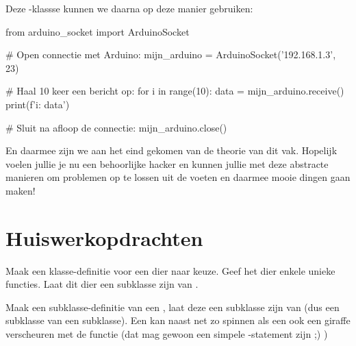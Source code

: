 Deze -klassse kunnen we daarna op deze manier gebruiken:
\begin{python}
from arduino_socket import ArduinoSocket

# Open connectie met Arduino:
mijn_arduino = ArduinoSocket('192.168.1.3', 23)

# Haal 10 keer een bericht op:
for i in range(10):
    data = mijn_arduino.receive()
    print(f'{i}: {data}')

# Sluit na afloop de connectie:
mijn_arduino.close()
\end{python}

En daarmee zijn we aan het eind gekomen van de theorie van dit vak. Hopelijk voelen jullie je nu een behoorlijke hacker en kunnen jullie met deze abstracte manieren om problemen op te lossen uit de voeten en daarmee mooie dingen gaan maken!

%


\newpage

\section{Huiswerkopdrachten}
\vspace{5mm}

\begin{exercise}
  Maak een klasse-definitie voor een dier naar keuze. Geef het dier enkele unieke functies. Laat dit dier een subklasse zijn van .
\end{exercise}

\begin{exercise}
  Maak een subklasse-definitie van een , laat deze een subklasse zijn van  (dus een subklasse van een subklasse). Een  kan naast net zo spinnen als een  ook een giraffe verscheuren met de functie  (dat mag gewoon een simpele -statement zijn ;) )
\end{exercise}

